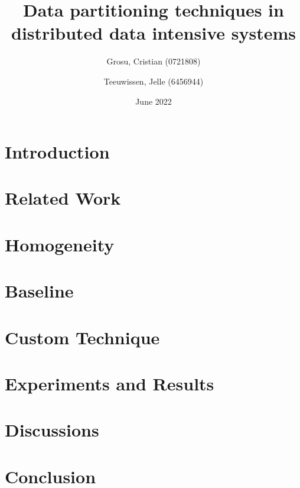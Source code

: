 \documentclass[conference]{IEEEtran}
\title{Data partitioning techniques in distributed data intensive systems}
\author{
  Grosu, Cristian (0721808)
  \and
  Teeuwissen, Jelle (6456944)
}
\date{June 2022}
\begin{document}
\maketitle

\pagestyle{fancy}
\fancyhf{}


\section{Introduction}
\label{Section:Introduction}


\section{Related Work}
\label{Section:RelatedWork}


\section{Homogeneity}
\label{Section:Homogeneity}


\section{Baseline}
\label{Section:Baseline}


\section{Custom Technique}
\label{Section:CustomTechnique}


\section{Experiments and Results}
\label{Section:ExperimentsResults}


\section{Discussions}
\label{Section:Discussions}


\section{Conclusion}
\label{Section:Conclusion}


\printbibliography

\clearpage 
{}
\label{Section:Appendix}

\end{document}
